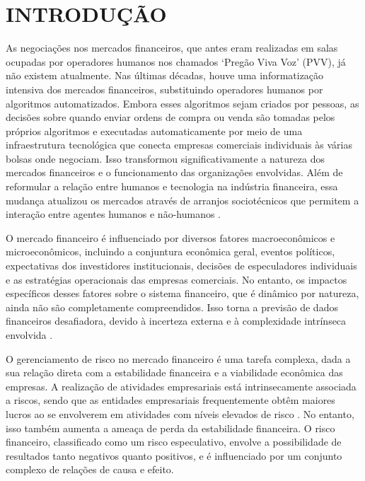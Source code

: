 \documentclass{iftex2024}
\begin{document}
\maketitle

\chapter{INTRODUÇÃO}

As negociações nos mercados financeiros, que antes eram realizadas em salas ocupadas por 
operadores humanos nos chamados `Pregão Viva Voz' (PVV), já não existem atualmente. 
Nas últimas décadas, houve uma informatização intensiva dos
mercados financeiros, substituindo operadores humanos por algoritmos automatizados.
Embora esses algoritmos sejam criados por pessoas, as decisões sobre quando enviar ordens
de compra ou venda são tomadas pelos próprios algoritmos e executadas automaticamente
por meio de uma infraestrutura tecnológica que conecta empresas comerciais individuais às
várias bolsas onde negociam. Isso transformou significativamente a natureza dos mercados
financeiros e o funcionamento das organizações envolvidas. Além de reformular a relação
entre humanos e tecnologia na indústria financeira, essa mudança atualizou os mercados
através de arranjos sociotécnicos que permitem a interação entre agentes humanos e
não-humanos \cite{bointroducao}.

O mercado financeiro é influenciado por diversos fatores macroeconômicos e
microeconômicos, incluindo a conjuntura econômica geral, eventos políticos, expectativas
dos investidores institucionais, decisões de especuladores individuais e as estratégias
operacionais das empresas comerciais. No entanto, os impactos específicos desses fatores
sobre o sistema financeiro, que é dinâmico por natureza, ainda não são completamente
compreendidos. Isso torna a previsão de dados financeiros desafiadora, devido à incerteza
externa e à complexidade intrínseca envolvida \cite{TANG2022363}.

O gerenciamento de risco no mercado financeiro é uma tarefa 
complexa, dada a sua relação direta com a estabilidade financeira
e a viabilidade econômica das empresas. A realização de atividades empresariais está
intrinsecamente associada a riscos, sendo que as entidades empresariais frequentemente
obtêm maiores lucros ao se envolverem em atividades com níveis elevados de risco \cite{Pakhucha_Sievidova_Siadrysta_Mohilevsky_Oliynik_Bogdanovych_2021}. No
entanto, isso também aumenta a ameaça de perda da estabilidade financeira. O risco
financeiro, classificado como um risco especulativo, envolve a possibilidade de resultados
tanto negativos quanto positivos, e é influenciado por um conjunto complexo de relações
de causa e efeito. 
\end{document}
